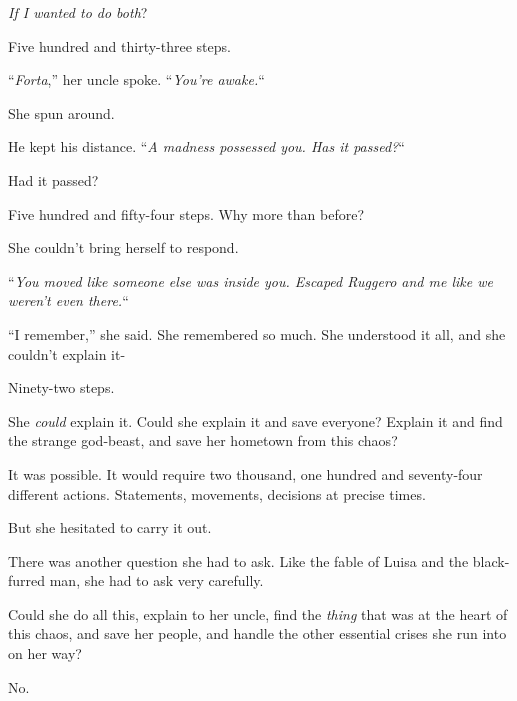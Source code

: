 \emph{If I wanted to do both}?



Five hundred and thirty-three steps.



``\emph{Forta},'' her uncle spoke.  ``\emph{You're awake.}``



She spun around.



He kept his distance.  ``\emph{A madness possessed you.  Has it passed?}``



Had it passed?



Five hundred and fifty-four steps.  Why more than before?



She couldn't bring herself to respond.



``\emph{You moved like someone else was inside you.  Escaped Ruggero and me like we weren't even there.}``



``I remember,'' she said.  She remembered so much.  She understood it all, and she couldn't explain it-



Ninety-two steps.



She \emph{could} explain it.  Could she explain it and save everyone?  Explain it and find the strange god-beast, and save her hometown from this chaos?



It was possible.  It would require two thousand, one hundred and seventy-four different actions.  Statements, movements, decisions at precise times.



But she hesitated to carry it out.



There was another question she had to ask.  Like the fable of Luisa and the black-furred man, she had to ask very carefully.



Could she do all this, explain to her uncle, find the \emph{thing} that was at the heart of this chaos, and save her people, and handle the other essential crises she run into on her way?



No.



